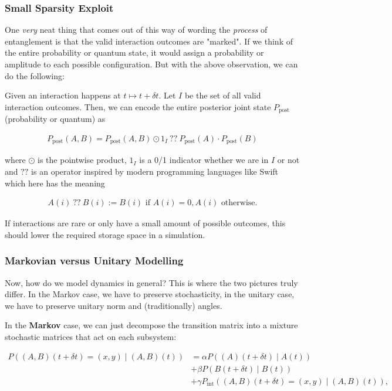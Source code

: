 \documentclass{article}
\begin{document}
\subsubsection{Small Sparsity Exploit}

One \textit{very} neat thing that comes out of this way of wording the \textit{process} of entanglement is that the valid interaction outcomes are "marked". If we think of the entire probability or quantum state, it would assign a probability or amplitude to each possible configuration. But with the above observation, we can do the following:

Given an interaction happens at $t\mapsto t+\delta t$. Let $I$ be the set of all valid interaction outcomes. Then, we can encode the entire posterior joint state $P_{\text{post}}$ (probability or quantum) as

\begin{align*}
P_{\text{post}}(A,B) = P_{\text{post}}(A,B) \odot 1_I \ ?? \ P_{\text{post}}(A)\cdot P_{\text{post}}(B)
\end{align*}

where $\odot$ is the pointwise product, $1_I$ is a 0/1 indicator whether we are in $I$ or not and $??$ is an operator inspired by modern programming languages like Swift which here has the meaning

\begin{align*}
A(i) \ ?? \ B(i) := B(i) \text{ if } A(i) = 0, A(i) \text{ otherwise}.
\end{align*}

If interactions are rare or only have a small amount of possible outcomes, this should lower the required storage space in a simulation.

\subsubsection{Markovian versus Unitary Modelling}

Now, how do we model dynamics in general? This is where the two pictures truly differ. In the Markov case, we have to preserve stochasticity, in the unitary case, we have to preserve unitary norm and (traditionally) angles.

In the \textbf{Markov} case, we can just decompose the transition matrix into a mixture stochastic matrices that act on each subsystem:

\begin{align*}
 P((A,B)(t+\delta t) = (x,y)\mid (A,B)(t)) &= \alpha P((A)(t + \delta t)\mid A(t))\\ & + \beta P(B(t+\delta t) \mid B(t)) \\ & + \gamma P_{\text{int}}((A,B)(t+\delta t) = (x,y)\mid (A,B)(t)), 
 \end{align*}
\end{document}

